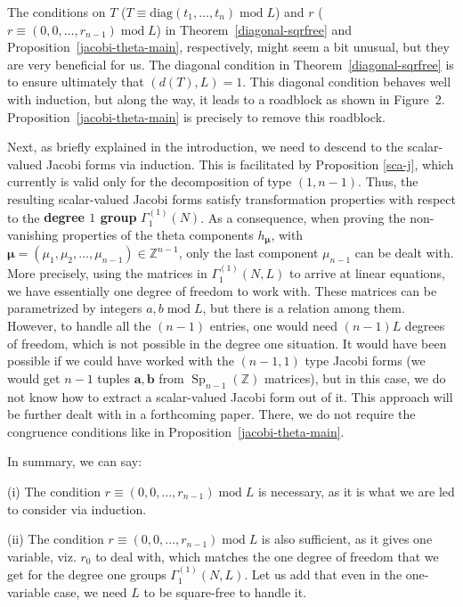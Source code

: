 \documentclass[11pt]{amsart}
\numberwithin{equation}{section}
\newcommand{\mbb}{\mathbb}
\newcommand{\mrm}{\mathrm} %
\renewcommand*{\mod}{\operatorname{mod}}
\newcommand*{\Sp}[2]{\operatorname{Sp}_{#1}(#2)}
\newcommand{\z}{\mathbb{Z}}
\newcommand{\dia}{\mrm{diag}}
\begin{document}
\begin{remark} \label{deg-freedom}
The conditions on $T$ ($T \equiv \dia(t_1,\ldots, t_n) \mod L$) and $r$ ($r \equiv (0,0,\ldots, r_{n-1}) \mod L$) in Theorem~\ref{diagonal-sqrfree} and Proposition~\ref{jacobi-theta-main}, respectively, might seem a bit unusual, but they are very beneficial for us. The diagonal condition in Theorem~\ref{diagonal-sqrfree} is to ensure ultimately that $(d(T),L)=1$. This diagonal condition behaves well with induction, but along the way, it leads to a roadblock as shown in Figure~2. Proposition~\ref{jacobi-theta-main} is precisely to remove this roadblock.

Next, as briefly explained in the introduction, we need to descend to the scalar-valued Jacobi forms via induction. This is facilitated by Proposition \ref{sca-j}, which currently is valid only for the decomposition of type $(1, n-1)$. Thus, the resulting scalar-valued Jacobi forms satisfy transformation properties with respect to the {\bf degree $1$ group} $\Gamma_1^{(1)}(N)$. As a consequence, when proving the non-vanishing properties of the theta components $h_{\bm\mu}$, with $\bm\mu=(\mu_1, \mu_2,...,\mu_{n-1})\in \mbb Z^{n-1}$, only the last component $\mu_{n-1}$ can be dealt with. More precisely, using the matrices in $\Gamma_1^{(1)}(N,L)$ to arrive at linear equations, we have essentially one degree of freedom to work with. These matrices can be parametrized by integers $a,b \mod L$, but there is a relation among them. However, to handle all the $(n-1)$ entries, one would need $(n-1)L$ degrees of freedom, which is not possible in the degree one situation. It would have been possible if we could have worked with the $(n-1,1)$ type Jacobi forms (we would get $n-1$ tuples ${\bm a,\bm b}$ from $\Sp{n-1}{\z}$ matrices), but in this case, we do not know how to extract a scalar-valued Jacobi form out of it. This approach will be further dealt with in a forthcoming paper. There, we do not require the congruence conditions like in Proposition~\ref{jacobi-theta-main}.

In summary, we can say:

(i) The condition  $r \equiv (0,0,\ldots, r_{n-1}) \mod L$ is necessary, as it is what we are led to consider via induction.

(ii) The condition  $r \equiv (0,0,\ldots, r_{n-1}) \mod L$ is also sufficient, as it gives one variable, viz. $r_0$ to deal with, which matches the one degree of freedom that we get for the degree one groups $\Gamma_1^{(1)}(N,L)$. Let us add that even in the one-variable case, we need $L$ to be square-free to handle it.
\end{remark}
\end{document}
